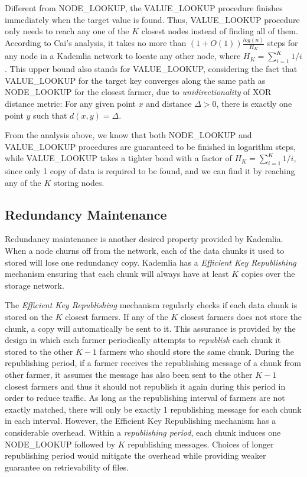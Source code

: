 Different from NODE\_LOOKUP, the VALUE\_LOOKUP procedure finishes immediately when the target value is found. Thus, VALUE\_LOOKUP procedure only needs to reach any one of the $K$ closest nodes instead of finding all of them. According to Cai's analysis\cite{cai2013probabilistic}, it takes no more than $(1+O(1))\frac{log(n)}{H_{K}}$ steps for any node in a Kademlia network to locate any other node, where $H_K = \sum_{i=1}^{K} 1/i$. This upper bound also stands for VALUE\_LOOKUP, considering the fact that VALUE\_LOOKUP for the target key converges along the same path as NODE\_LOOKUP for the closest farmer, due to \textit{unidirectionality} of XOR distance metric: For any given point $x$ and distance $\Delta>0$, there is exactly one point $y$ such that $d(x,y)=\Delta$.

From the analysis above, we know that both NODE\_LOOKUP and VALUE\_LOOKUP procedures are guaranteed to be finished in logarithm steps, while VALUE\_LOOKUP takes a tighter bond with a factor of $H_K = \sum_{i=1}^{K} 1/i$, since only 1 copy of data is required to be found, and we can find it by reaching any of the $K$ storing nodes.

\subsection{Redundancy Maintenance}
\label{ss:redundancymaintenance}
Redundancy maintenance is another desired property provided by Kademlia. When a node churns off from the network, each of the data chunks it used to stored will lose one redundancy copy. Kademlia has a \textit{Efficient Key Republishing} mechanism ensuring that each chunk will always have at least $K$ copies over the storage network.

The \textit{Efficient Key Republishing} mechanism regularly checks if each data chunk is stored on the $K$ closest farmers. If any of the $K$ closest farmers does not store the chunk, a copy will automatically be sent to it. This assurance is provided by the design in which each farmer periodically attempts to \textit{republish} each chunk it stored to the other $K-1$ farmers who should store the same chunk. During the republishing period, if a farmer receives the republishing message of a chunk from other farmer, it assumes the message has also been sent to the other $K-1$ closest farmers and thus it should not republish it again during this period in order to reduce traffic. As long as the republishing interval of farmers are not exactly matched, there will only be exactly 1 republishing message for each chunk in each interval. However, the Efficient Key Republishing mechanism has a considerable overhead. Within a \textit{republishing period}, each chunk induces one NODE\_LOOKUP followed by $K$ republishing messages. Choices of longer republishing period would mitigate the overhead while providing weaker guarantee on retrievability of files.

